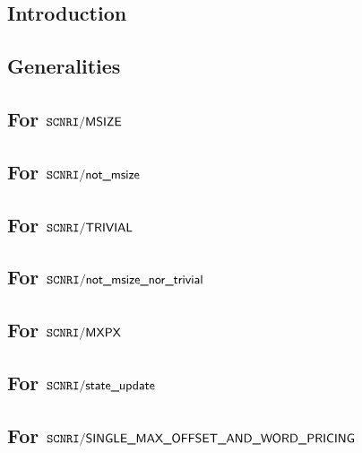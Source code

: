 \subsection{Introduction}                                          \label{mxp: computation: intro}                               
\subsection{Generalities}                                          \label{mxp: computation: generalities}                        
\subsection{For $\texttt{SCNRI}\textsf{/}{\textsf{MSIZE}}$}                               \label{mxp: computation: msize}                               
\subsection{For $\texttt{SCNRI}\textsf{/}{\textsf{not\_msize}}$}                         \label{mxp: computation: non msize}                           
\subsection{For $\texttt{SCNRI}\textsf{/}{\textsf{TRIVIAL}}$}                    \label{mxp: computation: trivial}                             
\subsection{For $\texttt{SCNRI}\textsf{/}{\textsf{not\_msize\_nor\_trivial}}$}               \label{mxp: computation: nontrivial}                          
\subsection{For $\texttt{SCNRI}\textsf{/}{\textsf{MXPX}}$}                                \label{mxp: computation: mxpx}                                
\subsection{For $\texttt{SCNRI}\textsf{/}{\textsf{state\_update}}$}                      \label{mxp: computation: nontrivial unexceptional}            
\subsection{For $\texttt{SCNRI}\textsf{/}{\textsf{SINGLE\_MAX\_OFFSET\_AND\_WORD\_PRICING}}$}       \label{mxp: computation: single max offset word}              
